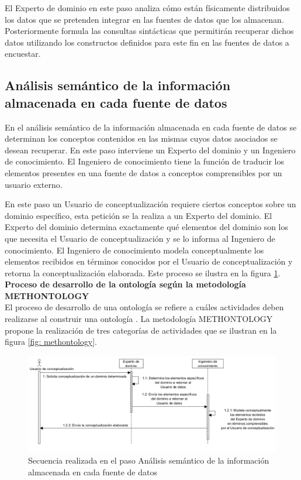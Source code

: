 El Experto de dominio en este paso analiza cómo están físicamente distribuidos los datos que se pretenden integrar en las fuentes de datos que los almacenan. Posteriormente formula las consultas sintácticas que permitirán recuperar dichos datos utilizando los constructos definidos para este fin en las fuentes de datos a encuestar.

\subsection{Análisis semántico de la información almacenada en cada fuente de datos}

En el análisis semántico de la información almacenada en cada fuente de datos se determinan los conceptos contenidos en las mismas cuyos datos asociados se desean recuperar. En este paso interviene un Experto del dominio y un Ingeniero de conocimiento. El Ingeniero de conocimiento tiene la función de traducir los elementos presentes en una fuente de datos a conceptos comprensibles por un usuario externo.

En este paso un Usuario de conceptualización requiere ciertos conceptos sobre un dominio específico, esta petición se la realiza a un Experto del dominio. El Experto del dominio determina exactamente qué elementos del dominio son los que necesita el Usuario de conceptualización y se lo informa al Ingeniero de conocimiento. El Ingeniero de conocimiento modela conceptualmente los elementos recibidos en términos conocidos por el Usuario de conceptualización y retorna la conceptualización elaborada. Este proceso se ilustra en la figura \ref{fig: conceptsExtraction}.\\

\textbf{Proceso de desarrollo de la ontología según la metodología METHONTOLOGY}\\

El proceso de desarrollo de una ontología se refiere a cuáles actividades deben realizarse al construir una ontología \citep{Gomez-Perez:2007:OEE:1199560}. La metodología METHONTOLOGY propone la realización de tres categorías de actividades que se ilustran en la figura \ref{fig: methontology}.

\begin{figure}
\begin{center}
	\includegraphics[width=1\textwidth]{img/conceptsExtraction.png}
\end{center}
\caption{Secuencia realizada en el paso Análisis semántico de la información almacenada en cada fuente de datos}
\label{fig: conceptsExtraction}
\end{figure}

